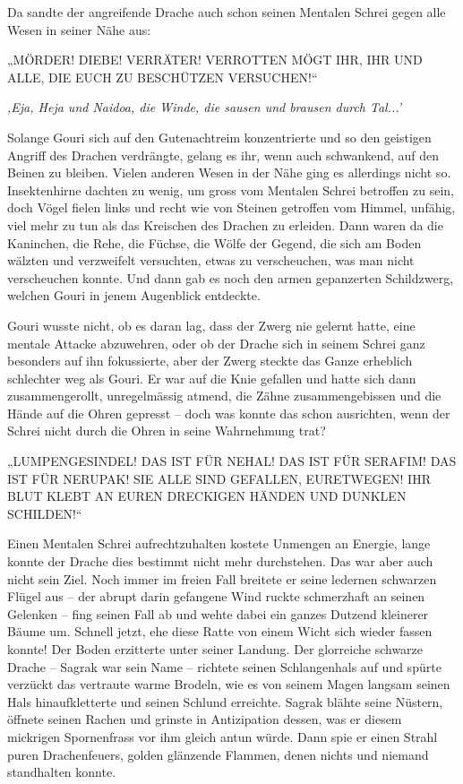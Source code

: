 Da sandte der angreifende Drache auch schon seinen Mentalen Schrei gegen alle Wesen in seiner Nähe aus:

„MÖRDER! DIEBE! VERRÄTER! VERROTTEN MÖGT IHR, IHR UND ALLE, DIE EUCH ZU BESCHÜTZEN VERSUCHEN!“

\textit{‚Eja, Heja und Naidoa, die Winde, die sausen und brausen durch Tal...’}

Solange Gouri sich auf den Gutenachtreim konzentrierte und so den geistigen Angriff des Drachen verdrängte, gelang es ihr, wenn auch schwankend, auf den Beinen zu bleiben. Vielen anderen Wesen in der Nähe ging es allerdings nicht so. Insektenhirne dachten zu wenig, um gross vom Mentalen Schrei betroffen zu sein, doch Vögel fielen links und recht wie von Steinen getroffen vom Himmel, unfähig, viel mehr zu tun als das Kreischen des Drachen zu erleiden. Dann waren da die Kaninchen, die Rehe, die Füchse, die Wölfe der Gegend, die sich am Boden wälzten und verzweifelt versuchten, etwas zu verscheuchen, was man nicht verscheuchen konnte. Und dann gab es noch den armen gepanzerten Schildzwerg, welchen Gouri in jenem Augenblick entdeckte.

Gouri wusste nicht, ob es daran lag, dass der Zwerg nie gelernt hatte, eine mentale Attacke abzuwehren, oder ob der Drache sich in seinem Schrei ganz besonders auf ihn fokussierte, aber der Zwerg steckte das Ganze erheblich schlechter weg als Gouri. Er war auf die Knie gefallen und hatte sich dann zusammengerollt, unregelmässig atmend, die Zähne zusammengebissen und die Hände auf die Ohren gepresst – doch was konnte das schon ausrichten, wenn der Schrei nicht durch die Ohren in seine Wahrnehmung trat?

„LUMPENGESINDEL! DAS IST FÜR NEHAL! DAS IST FÜR SERAFIM! DAS IST FÜR NERUPAK! SIE ALLE SIND GEFALLEN, EURETWEGEN! IHR BLUT KLEBT AN EUREN DRECKIGEN HÄNDEN UND DUNKLEN SCHILDEN!“

Einen Mentalen Schrei aufrechtzuhalten kostete Unmengen an Energie, lange konnte der Drache dies bestimmt nicht mehr durchstehen. Das war aber auch nicht sein Ziel. Noch immer im freien Fall breitete er seine ledernen schwarzen Flügel aus – der abrupt darin gefangene Wind ruckte schmerzhaft an seinen Gelenken – fing seinen Fall ab und wehte dabei ein ganzes Dutzend kleinerer Bäume um. Schnell jetzt, ehe diese Ratte von einem Wicht sich wieder fassen konnte! Der Boden erzitterte unter seiner Landung. Der glorreiche schwarze Drache – Sagrak war sein Name – richtete seinen Schlangenhals auf und spürte verzückt das vertraute warme Brodeln, wie es von seinem Magen langsam seinen Hals hinaufkletterte und seinen Schlund erreichte. Sagrak blähte seine Nüstern, öffnete seinen Rachen und grinste in Antizipation dessen, was er diesem mickrigen Spornenfrass vor ihm gleich antun würde. Dann spie er einen Strahl puren Drachenfeuers, golden glänzende Flammen, denen nichts und niemand standhalten konnte.

